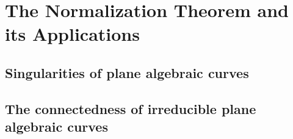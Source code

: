 \chapter{The Normalization Theorem and its Applications}\label{c2}
\section{Singularities of plane algebraic curves}\label{s2-1}

\section{The connectedness of irreducible plane algebraic curves}\label{s2-2}
